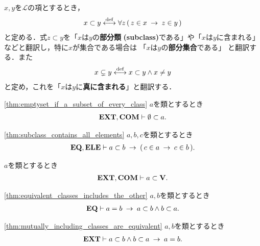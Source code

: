 	\begin{screen}
		\begin{dfn}[部分類]
			$x,y$を$\mathcal{L}$の項とするとき，
			\begin{align}
				x \subset y \overset{\mathrm{def}}{\longleftrightarrow}
				\forall z\, (\, z \in x \hspace{0.25em}\rightarrow\hspace{0.25em} z \in y\, )
			\end{align}
			と定める．式$z \subset y$を「$x$は$y$の{\bf 部分類}
			{\bf (subclass)}である」や「$x$は$y$に含まれる」などと翻訳し，特に$x$が集合である場合は
			「$x$は$y$の{\bf 部分集合}である」
			と翻訳する．また
			\begin{align}
				x \subsetneq y \overset{\mathrm{def}}{\longleftrightarrow} x \subset y \wedge x \neq y
			\end{align}
			と定め，これを「$x$は$y$に{\bf 真に含まれる}」と翻訳する．
		\end{dfn}
	\end{screen}
	
	\begin{screen}
		\begin{thm}[空集合は全ての類に含まれる]
		\ref{thm:emptyset_if_a_subset_of_every_class}
			$a$を類とするとき
			\begin{align}
				\mbox{{\bf EXT}},\mbox{\bf COM} \vdash \emptyset \subset a.
			\end{align}
		\end{thm}
	\end{screen}
	
	\begin{screen}
		\begin{thm}[類はその部分類に属する全ての類を要素に持つ]
		\ref{thm:subclass_contains_all_elements}
			$a,b,c$を類とするとき
			\begin{align}
				\mbox{{\bf EQ}},\mbox{{\bf ELE}} \vdash 
				a \subset b \hspace{0.25em}\rightarrow\hspace{0.25em} (\, c \in a \hspace{0.25em}\rightarrow\hspace{0.25em} c \in b\, ).
			\end{align}
		\end{thm}
	\end{screen}
	
	\begin{screen}
		\begin{thm}
			$a$を類とするとき
			\begin{align}
				\mbox{{\bf EXT}},\mbox{\bf COM} \vdash a \subset \mathbf{V}.
			\end{align}
		\end{thm}
	\end{screen}
	
	\begin{screen}
		\begin{thm}[等しい類は相手を包含する]
		\ref{thm:equivalent_classes_includes_the_other}
			$a,b$を類とするとき
			\begin{align}
				\mbox{{\bf EQ}} \vdash a = b \hspace{0.25em}\rightarrow\hspace{0.25em} a \subset b \wedge b \subset a.
			\end{align}
		\end{thm}
	\end{screen}
	
	\begin{screen}
		\begin{thm}[互いに相手を包含する類同士は等しい]
		\ref{thm:mutually_including_classes_are_equivalent}
			$a,b$を類とするとき
			\begin{align}
				\mbox{{\bf EXT}} \vdash a \subset b \wedge b \subset a \hspace{0.25em}\rightarrow\hspace{0.25em} a = b.
			\end{align}
		\end{thm}
	\end{screen}